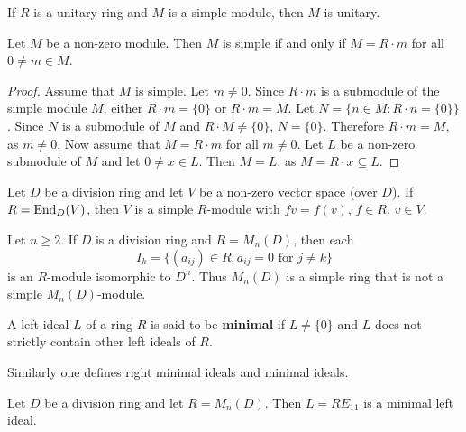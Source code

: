 If $R$ is a unitary ring and $M$ is a simple 
module, then $M$ is unitary. 


\begin{lemma}
	\label{lemma:simple}
	Let $M$ be a non-zero module. Then $M$ is simple if and only if $M=R\cdot m$
	for all $0\ne m\in M$.
\end{lemma}

\begin{proof}
	Assume that $M$ is simple.  Let $m\ne 0$. Since $R\cdot m$ is a submodule of the simple 
	module $M$, either $R\cdot m=\{0\}$ or $R\cdot m=M$.  Let $N=\{n\in M:R\cdot n=\{0\}\}$. Since $N$ is a 
	submodule of $M$ and $R\cdot M\ne\{0\}$, $N=\{0\}$. Therefore $R\cdot m=M$, as $m\ne0$.
	Now assume that $M=R\cdot m$ for all $m\ne0$. Let $L$ be a non-zero submodule of 
	$M$ and let $0\ne x\in L$. Then $M=L$, as $M=R\cdot x\subseteq L$. 
\end{proof} 

\begin{example}
	Let $D$ be a division ring and let $V$ be a non-zero vector space (over $D$). If 
	$R=\operatorname{End}_D(V)$, then $V$ is a simple $R$-module with $fv=f(v)$, $f\in R$.
	$v\in V$. 
\end{example}

\begin{example}
	\label{exa:I_k}
	Let $n\geq2$.  If $D$ is a division ring and $R=M_n(D)$, then each 
	\[
	I_k=\{ (a_{ij})\in R:a_{ij}=0\text{ for $j\ne k$}\}
	\]
	is an $R$-module isomorphic to $D^n$. 
	Thus $M_{n}(D)$ is a simple ring that is not a simple $M_n(D)$-module.
\end{example}

\begin{definition}
A left ideal $L$ of a ring $R$ is said to be \textbf{minimal} if $L\ne\{0\}$ and 
$L$ does not strictly contain other left ideals of $R$. 
\end{definition}

Similarly one defines
right minimal ideals and minimal ideals. 

\begin{example}
	Let $D$ be a division ring and let $R=M_n(D)$. Then $L=RE_{11}$ 
	is a minimal left ideal.
\end{example}

